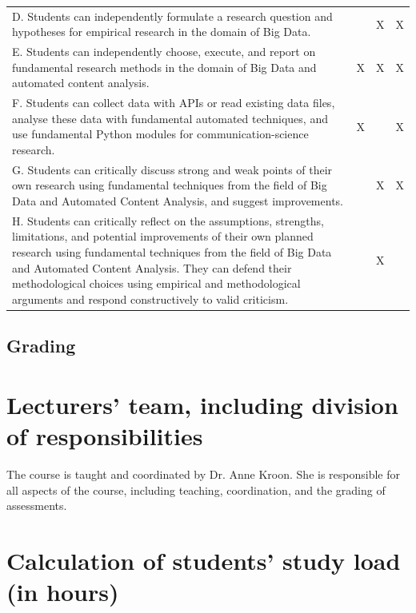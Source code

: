\documentclass[a4paper,12pt]{report}
\begin{document}
\begin{table}[hbt!]
{\begin{tabular}{@{}p{10.2cm}ccc@{}}
    D. Students can independently formulate a research question and hypotheses for empirical research in the domain of Big Data. &  & X & X \\
    E. Students can independently choose, execute, and report on fundamental research methods in the domain of Big Data and automated content analysis. & X & X & X \\
    F. Students can collect data with APIs or read existing data files, analyse these data with fundamental automated techniques, and use fundamental Python modules for communication-science research. & X &  & X \\
    G. Students can critically discuss strong and weak points of their own research using fundamental techniques from the field of Big Data and Automated Content Analysis, and suggest improvements. &  & X & X \\
    H. Students can critically reflect on the assumptions, strengths, limitations, and potential improvements of their own planned research using fundamental techniques from the field of Big Data and Automated Content Analysis. They can defend their methodological choices using empirical and methodological arguments and respond constructively to valid criticism. &  & X &  \\ \bottomrule
    \end{tabular}%
    }
\end{table}
\endgroup

\section*{Grading}


\chapter{Lecturers' team, including division of responsibilities}

The course is taught and coordinated by Dr. Anne Kroon. She is responsible for all aspects of the course, including teaching, coordination, and the grading of assessments.

\chapter{Calculation of students' study load (in hours)}
\end{document}
